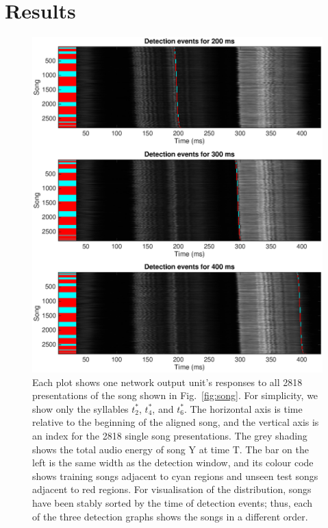 \documentclass[10pt,letterpaper]{article}
\newcommand\fig[1]{Fig.~\ref{#1}}
\begin{document}
\section{Results}
\label{sec:results}

\begin{figure}
  \includegraphics[width=\textwidth]{detection_raster}
  \caption{Each plot shows one network output unit's responses to all
    2818 presentations of the song shown in \fig{fig:song}.  For
    simplicity, we show only the syllables $t^*_2$, $t^*_4$, and $t^*_6$. The
    horizontal axis is time relative to the beginning of the aligned
    song, and the vertical axis is an index for the 2818 single song
    presentations. The grey shading shows the total audio energy of
    song Y at time T. The bar on the left is the same width as the
    detection window, and its colour code shows training songs
    adjacent to cyan regions and unseen test songs adjacent to red
    regions. For visualisation of the distribution, songs have been
    stably sorted by the time of detection events; thus, each of the
    three detection graphs shows the songs in a different order.}
  \label{fig:detection_raster}
\end{figure}
\end{document}

